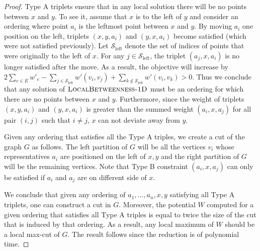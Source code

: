 \documentclass{article}
\theoremstyle{definition}  %
\theoremstyle{plain}
\numberwithin{observation}{section}
\numberwithin{claim}{section}
\numberwithin{fact}{section}
\numberwithin{lemma}{section}
\numberwithin{proposition}{section}
\numberwithin{theorem}{section}
\numberwithin{corollary}{section}
\numberwithin{definition}{section}
\newcommand{\calS}{\ensuremath{\mathcal{S}}}
\newcommand{\betweeness}{\textsc{LocalBetweenness-1D}}
\theoremstyle{plain}
\begin{document}
\begin{proof}
Type A triplets ensure that in any local solution there will be no points between $x$ and $y$. To see it, assume that $x$ is to the left of $y$ and consider an ordering where point $a_i$ is the leftmost point between $x$ and $y.$ By moving $a_i$ one position on the left, triplets $(x,y,a_i)$ and $(y,x,a_i)$ become satisfied (which were not satisfied previously). Let $\calS_{\text{left}}$ denote the set of indices of points that were originally to the left of $x$. For any $j \in \calS_{\text{left}}$,  the triplet $(a_j, x, a_i)$ is no longer satisfied after the move. As a result, the objective will increase by $2 \sum_{e \in E} w'_{e} - \sum_{j \in \calS_{\text{left}}} w'(v_i, v_j) + \sum_{k \notin \calS_{\text{left}}} w'(v_i, v_k) > 0$. Thus we conclude that any solution of $\betweeness$ must be an ordering for which there are no points between $x$ and $y.$ Furthermore, since the weight of triplets $(x, y, a_i)$ and $(y, x, a_i)$ is greater than the summed weight $(a_i, x, a_j)$ for all pair $(i, j)$ such that $ i \neq j$, $x$ can not deviate away from $y$. 

Given any ordering that satisfies all the Type A triples, we create a cut of the graph $G$ as follows. The left partition of $G$ will be all the vertices $v_i$ whose representatives $a_i$ are positioned on the left of $x,y$ and the right partition of $G$ will be the remaining vertices. Note that Type B constraint $(a_i, x, a_j)$ can only be satisfied if $a_i$ and $a_j$ are on different side of $x$.

We conclude that given any ordering of $a_1, \dots, a_n, x, y$ satisfying all Type A triplets, one can construct a cut in $G$. Moreover, the potential $W$ computed for a given ordering that satisfies all Type A triples is equal to twice the size of the cut that is induced by that ordering. As a result, any local maximum of $W$ should be a local max-cut of $G.$ The result follows since the reduction is of polynomial time.




\end{proof}
\end{document}
